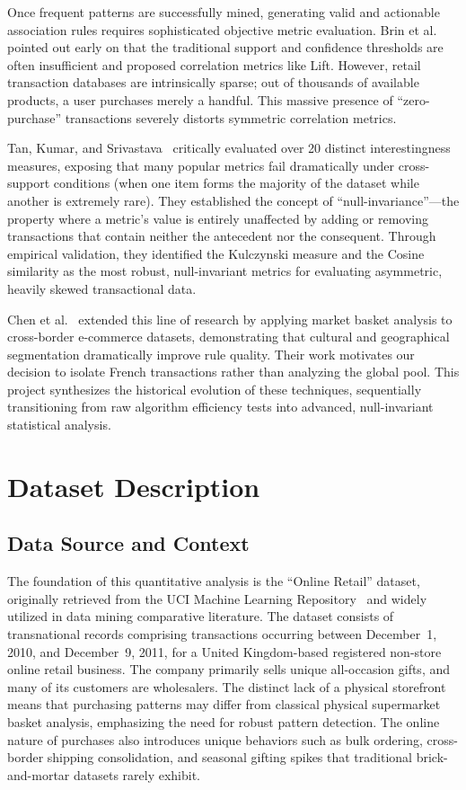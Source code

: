 \documentclass[conference]{IEEEtran}
\begin{document}
Once frequent patterns are successfully mined, generating valid and actionable association rules requires sophisticated objective metric evaluation. Brin et al.~\cite{b3} pointed out early on that the traditional support and confidence thresholds are often insufficient and proposed correlation metrics like Lift. However, retail transaction databases are intrinsically sparse; out of thousands of available products, a user purchases merely a handful. This massive presence of ``zero-purchase'' transactions severely distorts symmetric correlation metrics.

Tan, Kumar, and Srivastava~\cite{b4} critically evaluated over 20 distinct interestingness measures, exposing that many popular metrics fail dramatically under cross-support conditions (when one item forms the majority of the dataset while another is extremely rare). They established the concept of ``null-invariance''---the property where a metric's value is entirely unaffected by adding or removing transactions that contain neither the antecedent nor the consequent. Through empirical validation, they identified the Kulczynski measure and the Cosine similarity as the most robust, null-invariant metrics for evaluating asymmetric, heavily skewed transactional data.

Chen et al.~\cite{b7} extended this line of research by applying market basket analysis to cross-border e-commerce datasets, demonstrating that cultural and geographical segmentation dramatically improve rule quality. Their work motivates our decision to isolate French transactions rather than analyzing the global pool. This project synthesizes the historical evolution of these techniques, sequentially transitioning from raw algorithm efficiency tests into advanced, null-invariant statistical analysis.

\section{Dataset Description}

\subsection{Data Source and Context}
The foundation of this quantitative analysis is the ``Online Retail'' dataset, originally retrieved from the UCI Machine Learning Repository~\cite{b5} and widely utilized in data mining comparative literature. The dataset consists of transnational records comprising transactions occurring between December~1, 2010, and December~9, 2011, for a United Kingdom-based registered non-store online retail business. The company primarily sells unique all-occasion gifts, and many of its customers are wholesalers. The distinct lack of a physical storefront means that purchasing patterns may differ from classical physical supermarket basket analysis, emphasizing the need for robust pattern detection. The online nature of purchases also introduces unique behaviors such as bulk ordering, cross-border shipping consolidation, and seasonal gifting spikes that traditional brick-and-mortar datasets rarely exhibit.
\end{document}
